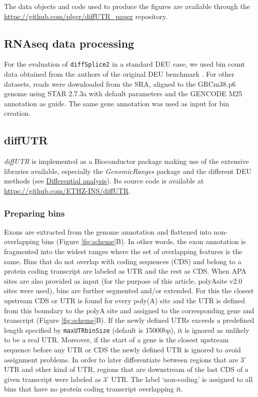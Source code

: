 \documentclass{bmcart}
\begin{document}
The data objects and code used to produce the figures are available through the \url{https://github.com/plger/diffUTR_paper} repository.

\subsection{RNAseq data processing}

For the evaluation of \texttt{diffSplice2} in a standard DEU case, we used bin count data obtained from the authors of the original DEU benchmark \cite{Soneson2016IsoformUsage}. For other datasets, reads were downloaded from the SRA, aligned to the GRCm38.p6 genome using STAR 2.7.3a with default parameters and the GENCODE M25 annotation as guide. The same gene annotation was used as input for bin creation.

\subsection{diffUTR}

\textit{diffUTR} is implemented as a Bioconductor package making use of the extensive libraries available, especially the \textit{GenomicRanges} package \cite{Lawrence2013SoftwareRanges} and the different DEU methods (see \hyperref[sec:DE]{Differential analysis}). Its source code is available at \url{https://github.com/ETHZ-INS/diffUTR}.

\subsubsection{Preparing bins}
\label{sec:bins}

Exons are extracted from the genome annotation and flattened into non-overlapping bins (Figure \ref{fig:scheme}B). In other words, the exon annotation is fragmented into the widest ranges where the set of overlapping features is the same. Bins that do not overlap with coding sequences (CDS) and belong to a protein coding transcript are labeled as UTR and the rest as CDS. When APA sites are also provided as input (for the purpose of this article, polyAsite v2.0 sites were used), bins are further segmented and/or extended. For this the closest upstream CDS or UTR is found for every poly(A) site and the UTR is defined from this boundary to the polyA site and assigned to the corresponding gene and transcript (Figure \ref{fig:scheme}B). If the newly defined UTRs exceeds a predefined length specified by \texttt{maxUTRbinSize} (default is 15000bp), it is ignored as unlikely to be a real UTR. Moreover, if the start of a gene is the closest upstream sequence before any UTR or CDS the newly defined UTR is ignored to avoid assignment problems. In order to later differentiate between regions that are 3' UTR and other kind of UTR, regions that are downstream of the last CDS of a given transcript were labeled as 3' UTR. The label `non-coding' is assigned to all bins that have no protein coding transcript overlapping it.
\end{document}

